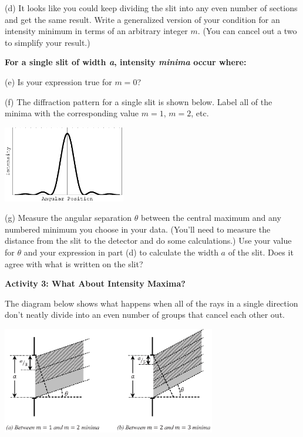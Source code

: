 (d) It looks like you could keep dividing the slit into any even number of sections and get the same result.  Write a generalized version of your condition for an intensity minimum in terms of an arbitrary integer $m$.  (You can cancel out a two to simplify your result.)

\answerspace{0.1in}
\hspace{0.8in}\textbf{For a single slit of width \textit{a}, intensity \textit{minima} occur where: }
\answerspace{0.1in}

(e) Is your expression true for $m=0$?
\answerspace{0.4in}

(f) The diffraction pattern for a single slit is shown below.  Label all of the minima with the corresponding value $m=1$, $m=2$, etc.  

\begin{center}
\includegraphics[width=0.4\textwidth]{diffraction_of_light/diffraction_of_light_fig_3.eps}
\end{center}

\pagebreak[3]

(g) Measure the angular separation $\theta$ between the central maximum and any numbered minimum you choose in your data.  (You'll need to measure the distance from the slit to the detector and do some calculations.)  Use your value for $\theta$ and your expression in part (d) to calculate the width $a$ of the slit.  Does it agree with what is written on the slit?
\answerspace{1.0in}


\textbf{Activity 3: What About Intensity Maxima?}

The diagram below shows what happens when all of the rays in a single direction don't neatly divide into an even number of groups that cancel each other out.

\vspace{-0.2in}
\begin{center}
\includegraphics[width=0.7\textwidth]{diffraction_of_light/diffraction_maxima.eps}
\end{center}
\vspace{-0.2in}

